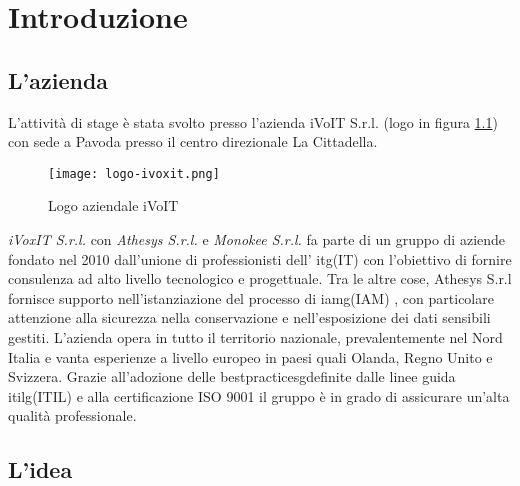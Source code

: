 
\chapter{Introduzione}
\label{cap:introduzione}
\section{L'azienda}

L'attività di stage è stata svolto presso l'azienda iVoIT S.r.l. (logo in figura \ref{fig:Logo-iVoIT}) con sede a Pavoda presso il 
centro direzionale La Cittadella. 
\begin{figure}[!h]
    
    \centering
    \texttt{[image: logo-ivoxit.png]} 
    \caption{Logo aziendale iVoIT}
    \label{fig:Logo-iVoIT} 
\end{figure}
\textit{iVoxIT S.r.l.} con \textit{Athesys S.r.l.} e \textit{Monokee S.r.l.} fa parte di un gruppo di aziende fondato nel 2010 dall’unione di professionisti dell’  \gls{itg}\glsfirstoccur (IT) con l’obiettivo di fornire consulenza ad alto livello tecnologico e progettuale. Tra le altre cose, Athesys S.r.l fornisce supporto
nell’istanziazione del processo di \gls{iamg}\glsfirstoccur (IAM) , con particolare
attenzione alla sicurezza nella conservazione e nell’esposizione dei dati sensibili gestiti.
L’azienda opera in tutto il territorio nazionale, prevalentemente nel Nord Italia e
vanta esperienze a livello europeo in paesi quali Olanda, Regno Unito e Svizzera.
Grazie all’adozione delle \gls{bestpracticesg}\glsfirstoccur definite dalle linee guida \gls{itilg}\glsfirstoccur (ITIL)  e alla certificazione ISO 9001 il gruppo è
in grado di assicurare un’alta qualità professionale.

\section{L'idea}

